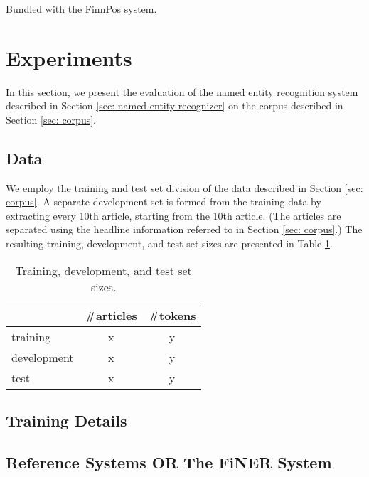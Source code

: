 \documentclass[11pt]{article}
\begin{document}
Bundled with the FinnPos system.


\section{Experiments}
\label{sec: experiments}

In this section, we present the evaluation of the named entity recognition system described in Section \ref{sec: named entity recognizer} on the corpus described in Section \ref{sec: corpus}.

\subsection{Data}
\label{sec: data}

We employ the training and test set division of the data described in Section \ref{sec: corpus}. A separate development set is formed from the training data by extracting every 10th article, starting from the 10th article. (The articles are separated using the headline information referred to in Section \ref{sec: corpus}.) The resulting training, development, and test set sizes are presented in Table \ref{tab: set sizes}.

\begin{table}[t!]
\begin{center}
\begin{tabular}{lcc} 
 & \#articles & \#tokens \\
\hline
\noalign{\smallskip}
training & x & y  \\
development  & x & y  \\
test & x & y \\
\end{tabular}
\end{center}
\caption{Training, development, and test set sizes.}
\label{tab: set sizes}
\end{table}


\subsection{Training Details}
\label{sec: training details}



\subsection{Reference Systems OR The FiNER System}
\label{sec: reference systems}
\end{document}
